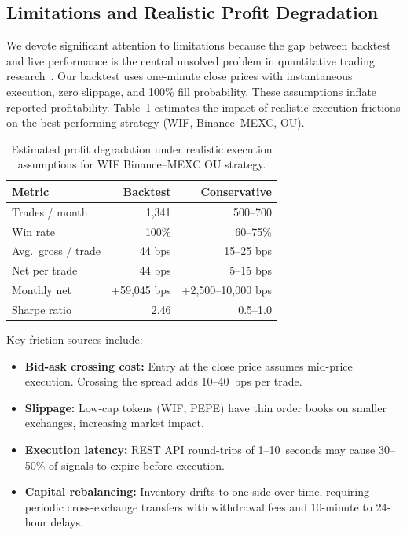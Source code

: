 \documentclass[sigconf,nonacm=false]{acmart}
\begin{document}
\subsection{Limitations and Realistic Profit Degradation}\label{sec:limitations}

We devote significant attention to limitations because the gap between backtest and live performance is the central unsolved problem in quantitative trading research~\cite{makarov2020trading}. Our backtest uses one-minute close prices with instantaneous execution, zero slippage, and 100\% fill probability. These assumptions inflate reported profitability. Table~\ref{tab:realistic} estimates the impact of realistic execution frictions on the best-performing strategy (WIF, Binance--MEXC, OU).

\begin{table}[h]
\caption{Estimated profit degradation under realistic execution assumptions for WIF Binance--MEXC OU strategy.}
\label{tab:realistic}
\begin{tabular}{lrr}
\toprule
\textbf{Metric} & \textbf{Backtest} & \textbf{Conservative} \\
\midrule
Trades / month       & 1,341    & 500--700 \\
Win rate             & 100\%    & 60--75\% \\
Avg.\ gross / trade  & 44 bps   & 15--25 bps \\
Net per trade        & 44 bps   & 5--15 bps \\
Monthly net          & +59,045 bps & +2,500--10,000 bps \\
Sharpe ratio         & 2.46     & 0.5--1.0 \\
\bottomrule
\end{tabular}
\end{table}

Key friction sources include:
\begin{itemize}
    \item \textbf{Bid-ask crossing cost:} Entry at the close price assumes mid-price execution. Crossing the spread adds 10--40~bps per trade.
    \item \textbf{Slippage:} Low-cap tokens (WIF, PEPE) have thin order books on smaller exchanges, increasing market impact.
    \item \textbf{Execution latency:} REST API round-trips of 1--10~seconds may cause 30--50\% of signals to expire before execution.
    \item \textbf{Capital rebalancing:} Inventory drifts to one side over time, requiring periodic cross-exchange transfers with withdrawal fees and 10-minute to 24-hour delays.
\end{itemize}
\end{document}
